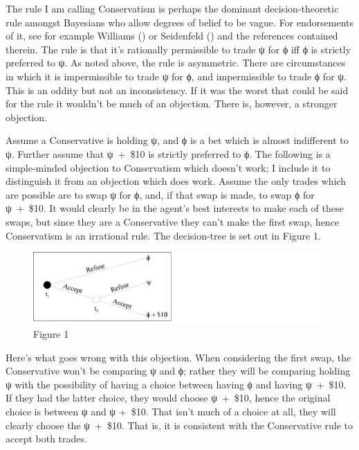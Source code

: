 \documentclass[
  10pt,
  letterpaper,
  DIV=11,
  numbers=noendperiod,
  twoside]{scrartcl}
\begin{document}
The rule I am calling Conservatism is perhaps the dominant
decision-theoretic rule amongst Bayesians who allow degrees of belief to
be vague. For endorsements of it, see for example Williams
() or Seidenfeld
() and the references contained
therein. The rule is that it's rationally permissible to trade ψ for ϕ
iff ϕ is strictly preferred to ψ. As noted above, the rule is
asymmetric. There are circumstances in which it is impermissible to
trade ψ for ϕ, and impermissible to trade ϕ for ψ. This is an oddity but
not an inconsistency. If it was the worst that could be said for the
rule it wouldn't be much of an objection. There is, however, a stronger
objection.

Assume a Conservative is holding ψ, and ϕ is a bet which is almost
indifferent to ψ. Further assume that ψ~+~\$10 is strictly preferred to
ϕ. The following is a simple-minded objection to Conservatism which
doesn't work; I include it to distinguish it from an objection which
does work. Assume the only trades which are possible are to swap ψ for
ϕ, and, if that swap is made, to swap ϕ for ψ~+~\$10. It would clearly
be in the agent's best interests to make each of these swaps, but since
they are a Conservative they can't make the first swap, hence
Conservatism is an irrational rule. The decision-tree is set out in
Figure 1.

\begin{figure}[H]

{\centering \includegraphics{vdt_tree.pdf}

}

\caption{Figure 1}

\end{figure}%

Here's what goes wrong with this objection. When considering the first
swap, the Conservative won't be comparing ψ and ϕ; rather they will be
comparing holding ψ with the possibility of having a choice between
having ϕ and having ψ~+~\$10. If they had the latter choice, they would
choose ψ~+~\$10, hence the original choice is between ψ and ψ +~\$10.
That isn't much of a choice at all, they will clearly choose the
ψ~+~\$10. That is, it is consistent with the Conservative rule to accept
both trades.
\end{document}
